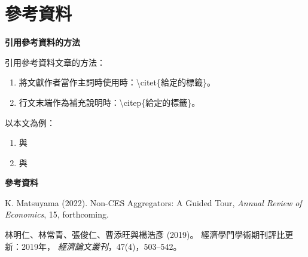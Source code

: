 \documentclass[12pt, aspectratio=169]{beamer}
\begin{document}

\section{參考資料}


\linespread{1} 
\begin{frame}{\textbf{引用參考資料的方法}}
\linespread{1.5}

	引用參考資料文章的方法：
	
	\begin{enumerate}[1]
		\item 將文獻作者當作主詞時使用時：\textbackslash citet\{給定的標籤\}。
		\item 行文末端作為補充說明時：\textbackslash citep\{給定的標籤\}。
	\end{enumerate}
	
	\bigskip
	
	以本文為例：
	
	\begin{enumerate}[1]
		\item \citet{Non-CES} 與 \citet{期刊評比}
		\item \citep{Non-CES} 與 \citep{期刊評比}
	\end{enumerate}
	
\end{frame}


\linespread{1} 
\begin{frame}{\textbf{參考資料}}
\linespread{1.5} 

\footnotesize

\begin{thebibliography}{99} 

		K. Matsuyama (2022). %
		\newblock Non-CES Aggregators: A Guided Tour, %
		\newblock \emph{Annual Review of Economics}, 15, forthcoming. %

		林明仁、林常青、張俊仁、曹添旺與楊浩彥 (2019)。 
		\newblock 經濟學門學術期刊評比更新：2019年，
		\newblock \emph{經濟論文叢刊}，47(4)，503--542。
		
\end{thebibliography}

\end{frame}
\end{document}
